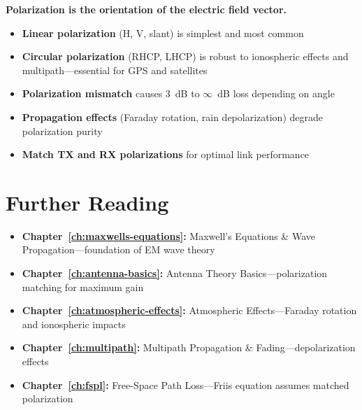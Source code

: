 \vspace{1em}

\begin{keyconcept}
\textbf{Polarization is the orientation of the electric field vector.}
\begin{itemize}
\item \textbf{Linear polarization} (H, V, slant) is simplest and most common
\item \textbf{Circular polarization} (RHCP, LHCP) is robust to ionospheric effects and multipath---essential for GPS and satellites
\item \textbf{Polarization mismatch} causes 3~dB to $\infty$~dB loss depending on angle
\item \textbf{Propagation effects} (Faraday rotation, rain depolarization) degrade polarization purity
\item \textbf{Match TX and RX polarizations} for optimal link performance
\end{itemize}
\end{keyconcept}

\section{Further Reading}

\begin{itemize}
\item \textbf{Chapter~\ref{ch:maxwells-equations}:} Maxwell's Equations \& Wave Propagation---foundation of EM wave theory
\item \textbf{Chapter~\ref{ch:antenna-basics}:} Antenna Theory Basics---polarization matching for maximum gain
\item \textbf{Chapter~\ref{ch:atmospheric-effects}:} Atmospheric Effects---Faraday rotation and ionospheric impacts
\item \textbf{Chapter~\ref{ch:multipath}:} Multipath Propagation \& Fading---depolarization effects
\item \textbf{Chapter~\ref{ch:fspl}:} Free-Space Path Loss---Friis equation assumes matched polarization
\end{itemize}
